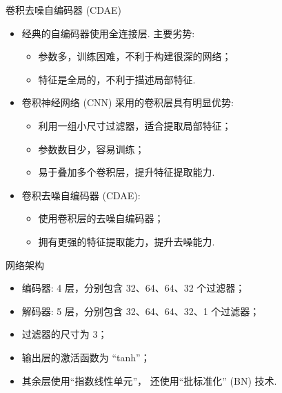 \documentclass{beamer}
\begin{document}
\begin{frame}{卷积去噪自编码器 (CDAE)}
  \begin{itemize}
    \item 经典的自编码器使用\alert{全连接层}.
      主要劣势:
      \begin{itemize}
        \item 参数多，训练困难，不利于构建很深的网络；
        \item 特征是全局的，不利于描述局部特征.
      \end{itemize}
    \item 卷积神经网络 (CNN) 采用的\alert{卷积层}具有明显优势:
      \begin{itemize}
        \item 利用一组小尺寸过滤器，适合提取局部特征；
        \item 参数数目少，容易训练；
        \item 易于叠加多个卷积层，提升特征提取能力.
      \end{itemize}
    \item \alert{卷积去噪自编码器 (CDAE)}:
      \begin{itemize}
        \item 使用卷积层的去噪自编码器；
        \item 拥有更强的特征提取能力，提升去噪能力.
      \end{itemize}
  \end{itemize}

  \vspace{-1ex}
\end{frame}

\begin{frame}{网络架构}
  \begin{itemize}
    \item 编码器: 4 层，分别包含 32、64、64、32 个过滤器；
    \item 解码器: 5 层，分别包含 32、64、64、32、1 个过滤器；
    \item 过滤器的尺寸为 3；
    \item 输出层的激活函数为 \enquote{tanh}；
    \item 其余层使用\enquote{指数线性单元}，
      还使用\enquote{批标准化} (BN) 技术.
  \end{itemize}
\end{frame}
\end{document}
